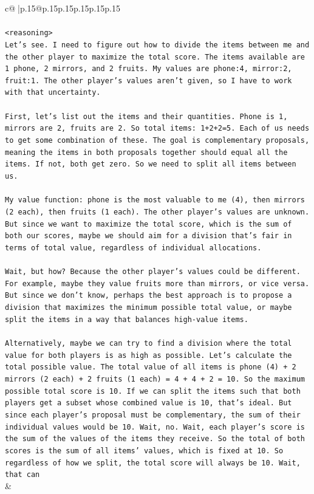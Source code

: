 \documentclass{article}
\begin{document}
{\begin{supertabular}{c@{$\;$}|p{.15\linewidth}@{}p{.15\linewidth}p{.15\linewidth}p{.15\linewidth}p{.15\linewidth}p{.15\linewidth}}
{{{\\ 
\\ 
\texttt{<reasoning>} \\
\texttt{Let's see. I need to figure out how to divide the items between me and the other player to maximize the total score. The items available are 1 phone, 2 mirrors, and 2 fruits. My values are phone:4, mirror:2, fruit:1. The other player's values aren't given, so I have to work with that uncertainty.} \\
\\ 
\texttt{First, let's list out the items and their quantities. Phone is 1, mirrors are 2, fruits are 2. So total items: 1+2+2=5. Each of us needs to get some combination of these. The goal is complementary proposals, meaning the items in both proposals together should equal all the items. If not, both get zero. So we need to split all items between us.} \\
\\ 
\texttt{My value function: phone is the most valuable to me (4), then mirrors (2 each), then fruits (1 each). The other player's values are unknown. But since we want to maximize the total score, which is the sum of both our scores, maybe we should aim for a division that's fair in terms of total value, regardless of individual allocations.} \\
\\ 
\texttt{Wait, but how? Because the other player's values could be different. For example, maybe they value fruits more than mirrors, or vice versa. But since we don't know, perhaps the best approach is to propose a division that maximizes the minimum possible total value, or maybe split the items in a way that balances high{-}value items.} \\
\\ 
\texttt{Alternatively, maybe we can try to find a division where the total value for both players is as high as possible. Let's calculate the total possible value. The total value of all items is phone (4) + 2 mirrors (2 each) + 2 fruits (1 each) = 4 + 4 + 2 = 10. So the maximum possible total score is 10. If we can split the items such that both players get a subset whose combined value is 10, that's ideal. But since each player's proposal must be complementary, the sum of their individual values would be 10. Wait, no. Wait, each player's score is the sum of the values of the items they receive. So the total of both scores is the sum of all items' values, which is fixed at 10. So regardless of how we split, the total score will always be 10. Wait, that can} \\
            }
        }
    }
    & \\ \\


\end{supertabular}}
\end{document}
